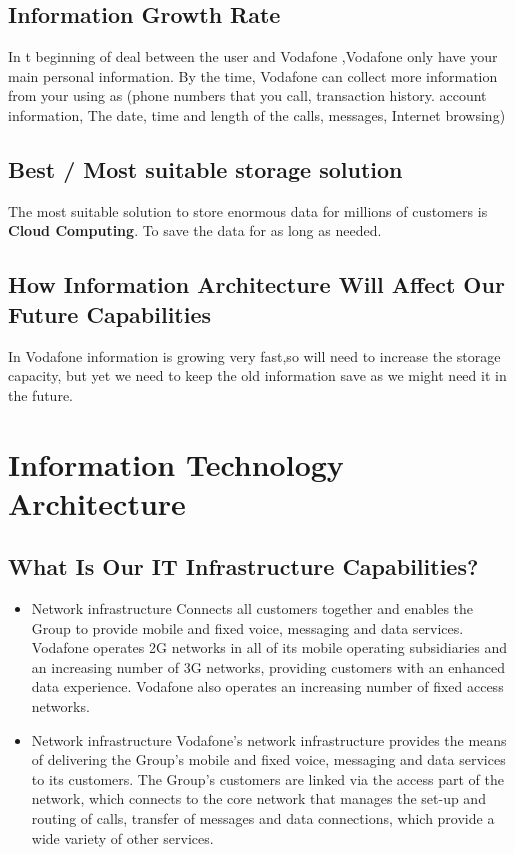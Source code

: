 \documentclass{book}
\begin{document}
\section{ Information Growth Rate}
In t beginning of deal between the user and Vodafone ,Vodafone only have your main personal information.
By the time, Vodafone can collect more information from your using as (phone numbers that you call, transaction history. account information, The date, time and length of the calls, messages, Internet browsing)
\section{Best / Most suitable storage solution}
The most suitable solution to store enormous data for millions of customers is \textbf{Cloud Computing}.
To save the data for as long as needed.
	 



\section{How Information Architecture Will Affect Our Future Capabilities}
In Vodafone information is growing very fast,so will need to increase the storage capacity, but yet we need to keep the old information save as we might need it in the future. 
\chapter{Information Technology Architecture}
\section{What Is Our IT Infrastructure Capabilities?}
\begin{itemize}
	\item Network infrastructure Connects all customers together and enables the Group to provide mobile and fixed voice, messaging and data services.	Vodafone operates 2G networks in all of its mobile operating subsidiaries and an increasing number of 3G networks, providing customers with an enhanced data experience. Vodafone also operates an increasing number of fixed access networks.
\item Network infrastructure Vodafone’s network infrastructure provides the means of delivering the Group’s mobile and fixed voice, messaging and data services to its customers. The Group’s customers are linked via the access part of the network, which connects to the core network that manages the set-up and routing of calls, transfer of messages and data connections, which provide a wide variety of other services.
\end{itemize}
\end{document}

